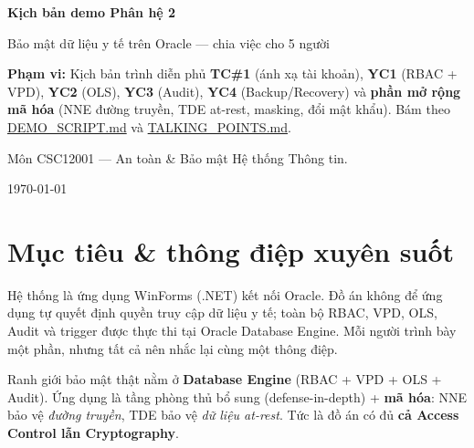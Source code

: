 \documentclass[12pt,a4paper]{article}
\DeclareRobustCommand{\code}[1]{\begingroup\urlstyle{tt}\url{#1}\endgroup}
\DeclareRobustCommand{\file}[1]{\code{#1}}
\begin{document}
\begin{titlepage}
    \centering
    \vspace*{1.6cm}
    {\Huge\bfseries Kịch bản demo Phân hệ 2\\[0.35cm]}
    \vspace{0.7cm}
    {\Large Bảo mật dữ liệu y tế trên Oracle — chia việc cho 5 người\par}
    \vspace{1.2cm}
    \begin{infobox}
    \textbf{Phạm vi:} Kịch bản trình diễn phủ \textbf{TC\#1} (ánh xạ tài khoản), \textbf{YC1} (RBAC + VPD),
    \textbf{YC2} (OLS), \textbf{YC3} (Audit), \textbf{YC4} (Backup/Recovery) và \textbf{phần mở rộng mã hóa}
    (NNE đường truyền, TDE at-rest, masking, đổi mật khẩu). Bám theo \file{DEMO_SCRIPT.md} và \file{TALKING_POINTS.md}.
    \end{infobox}
    \vfill
    {\large Môn CSC12001 — An toàn \& Bảo mật Hệ thống Thông tin.\par}
    \vspace{0.6cm}
    {\large \today\par}
\end{titlepage}

\tableofcontents
\clearpage
{}

\section{Mục tiêu \& thông điệp xuyên suốt}

Hệ thống là ứng dụng WinForms (.NET) kết nối Oracle. Đồ án không để ứng dụng tự quyết định quyền
truy cập dữ liệu y tế; toàn bộ RBAC, VPD, OLS, Audit và trigger được thực thi tại Oracle Database
Engine. Mỗi người trình bày một phần, nhưng tất cả nên nhắc lại cùng một thông điệp.

\begin{keybox}[title={Thông điệp xuyên suốt (mọi người nhắc lại)}]
Ranh giới bảo mật thật nằm ở \textbf{Database Engine} (RBAC + VPD + OLS + Audit). Ứng dụng là tầng
phòng thủ bổ sung (defense-in-depth) + \textbf{mã hóa}: NNE bảo vệ \emph{đường truyền}, TDE bảo vệ
\emph{dữ liệu at-rest}. Tức là đồ án có đủ \textbf{cả Access Control lẫn Cryptography}.
\end{keybox}
\end{document}
